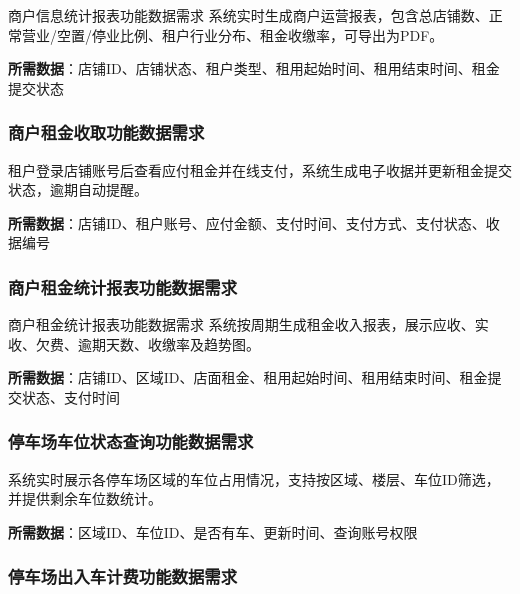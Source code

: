 \documentclass[]{article}
\begin{document}
商户信息统计报表功能数据需求
系统实时生成商户运营报表，包含总店铺数、正常营业/空置/停业比例、租户行业分布、租金收缴率，可导出为PDF。

\textbf{所需数据}：店铺ID、店铺状态、租户类型、租用起始时间、租用结束时间、租金提交状态

\hypertarget{ux5546ux6237ux79dfux91d1ux6536ux53d6ux529fux80fdux6570ux636eux9700ux6c42}{%
\subsubsection{商户租金收取功能数据需求}\label{ux5546ux6237ux79dfux91d1ux6536ux53d6ux529fux80fdux6570ux636eux9700ux6c42}}

租户登录店铺账号后查看应付租金并在线支付，系统生成电子收据并更新租金提交状态，逾期自动提醒。

\textbf{所需数据}：店铺ID、租户账号、应付金额、支付时间、支付方式、支付状态、收据编号

\hypertarget{ux5546ux6237ux79dfux91d1ux7edfux8ba1ux62a5ux8868ux529fux80fdux6570ux636eux9700ux6c42}{%
\subsubsection{商户租金统计报表功能数据需求}\label{ux5546ux6237ux79dfux91d1ux7edfux8ba1ux62a5ux8868ux529fux80fdux6570ux636eux9700ux6c42}}

商户租金统计报表功能数据需求
系统按周期生成租金收入报表，展示应收、实收、欠费、逾期天数、收缴率及趋势图。

\textbf{所需数据}：店铺ID、区域ID、店面租金、租用起始时间、租用结束时间、租金提交状态、支付时间

\hypertarget{ux505cux8f66ux573aux8f66ux4f4dux72b6ux6001ux67e5ux8be2ux529fux80fdux6570ux636eux9700ux6c42}{%
\subsubsection{停车场车位状态查询功能数据需求}\label{ux505cux8f66ux573aux8f66ux4f4dux72b6ux6001ux67e5ux8be2ux529fux80fdux6570ux636eux9700ux6c42}}

系统实时展示各停车场区域的车位占用情况，支持按区域、楼层、车位ID筛选，并提供剩余车位数统计。

\textbf{所需数据}：区域ID、车位ID、是否有车、更新时间、查询账号权限

\hypertarget{ux505cux8f66ux573aux51faux5165ux8f66ux8ba1ux8d39ux529fux80fdux6570ux636eux9700ux6c42}{%
\subsubsection{停车场出入车计费功能数据需求}\label{ux505cux8f66ux573aux51faux5165ux8f66ux8ba1ux8d39ux529fux80fdux6570ux636eux9700ux6c42}}
\end{document}
